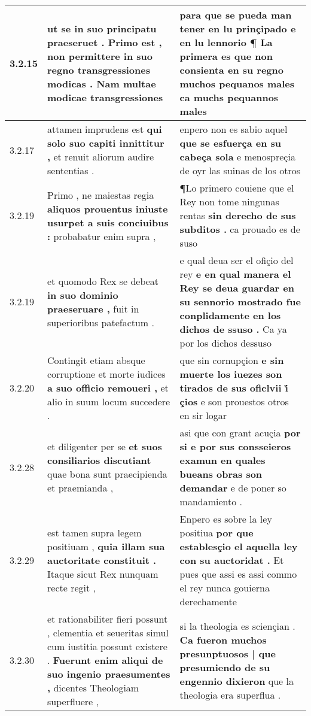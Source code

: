 \begin{tabular}{|p{1cm}|p{6.5cm}|p{6.5cm}|}
3.2.15 & ut se in suo principatu praeseruet . \textbf{ Primo est , non permittere in suo regno transgressiones modicas . } Nam multae modicae transgressiones & para que se pueda man tener en lu prinçipado e en lu lennorio ¶ \textbf{ La primera es que non consienta en su regno muchos pequanos males } ca muchs pequannos males \\\hline
3.2.17 & attamen imprudens est \textbf{ qui solo suo capiti innittitur , } et renuit aliorum audire sententias . & enpero non es sabio aquel \textbf{ que se esfuerça en su cabeça sola } e menospreçia de oyr las suinas de los otros \\\hline
3.2.19 & Primo , ne maiestas regia \textbf{ aliquos prouentus iniuste usurpet a suis conciuibus : } probabatur enim supra , & ¶Lo primero couiene que el Rey non tome ningunas rentas \textbf{ sin derecho de sus subditos . } ca prouado es de suso \\\hline
3.2.19 & et quomodo Rex se debeat \textbf{ in suo dominio praeseruare , } fuit in superioribus patefactum . & e qual deua ser el ofiçio del rey \textbf{ e en qual manera el Rey se deua guardar en su sennorio mostrado fue conplidamente en los dichos de ssuso . } Ca ya por los dichos dessuso \\\hline
3.2.20 & Contingit etiam absque corruptione et morte iudices \textbf{ a suo officio remoueri , } et alio in suum locum succedere . & que sin cornupçion \textbf{ e sin muerte los iuezes son tirados de sus oficlvii i̊ çios } e son prouestos otros en sir logar \\\hline
3.2.28 & et diligenter per se \textbf{ et suos consiliarios discutiant } quae bona sunt praecipienda et praemianda , & asi que con grant acuçia \textbf{ por si e por sus consseieros examun en quales bueans obras son demandar } e de poner so mandamiento . \\\hline
3.2.29 & est tamen supra legem positiuam , \textbf{ quia illam sua auctoritate constituit . } Itaque sicut Rex nunquam recte regit , & Enpero es sobre la ley positiua \textbf{ por que establesçio el aquella ley con su auctoridat . } Et pues que assi es assi commo el rey nunca gouierna derechamente \\\hline
3.2.30 & et rationabiliter fieri possunt , clementia et seueritas simul cum iustitia possunt existere . \textbf{ Fuerunt enim aliqui de suo ingenio praesumentes , } dicentes Theologiam superfluere , & si la theologia es sciençian . \textbf{ Ca fueron muchos presunptuosos | que presumiendo de su engennio dixieron } que la theologia era superflua . \\\hline

\end{tabular}
